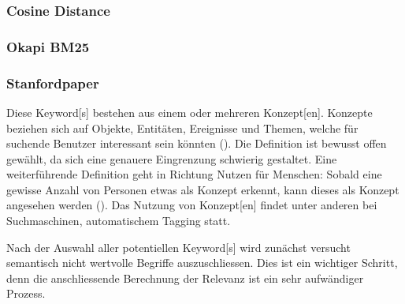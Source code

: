 


\subsubsection{Cosine Distance}




\subsubsection{Okapi BM25}



\subsubsection{Stanfordpaper}


Diese \gls{Keyword}[s] bestehen aus einem oder mehreren \gls{Konzept}[en]. Konzepte beziehen sich auf Objekte, Entitäten, Ereignisse und Themen, welche für suchende Benutzer interessant sein könnten (\cite{dalvi2009web}). Die Definition ist bewusst offen gewählt, da sich eine genauere Eingrenzung schwierig gestaltet. Eine weiterführende Definition geht in Richtung Nutzen für Menschen: Sobald eine gewisse Anzahl von Personen etwas als Konzept erkennt, kann dieses als Konzept angesehen werden (\cite{parameswaran2010towards}). Das Nutzung von \gls{Konzept}[en] findet unter anderen bei Suchmaschinen, automatischem Tagging statt.

Nach der Auswahl aller potentiellen \gls{Keyword}[s] wird zunächst versucht semantisch nicht wertvolle Begriffe auszuschliessen. Dies ist ein wichtiger Schritt, denn die anschliessende Berechnung der Relevanz ist ein sehr aufwändiger Prozess. 




